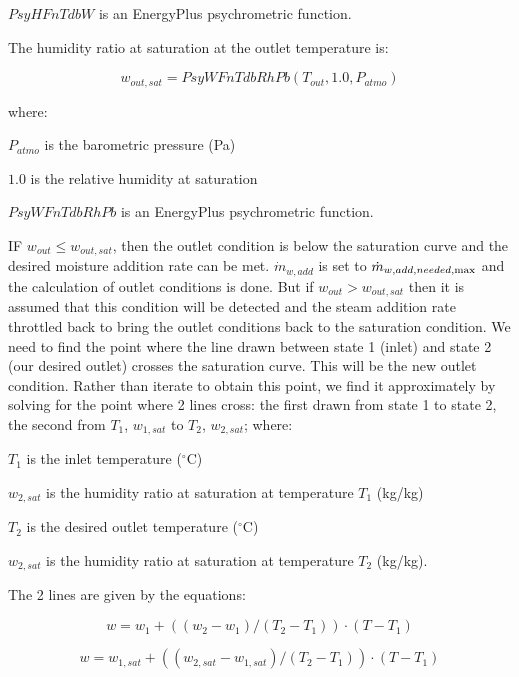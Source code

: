 \(PsyHFnTdbW\) is an EnergyPlus psychrometric function.

The humidity ratio at saturation at the outlet temperature is:

\begin{equation}
{w_{out,sat}} = PsyWFnTdbRhPb({T_{out}},1.0,{P_{atmo}})
\end{equation}

where:

\({P_{atmo}}\) is the barometric pressure (Pa)

\(1.0\) is the relative humidity at saturation

\(PsyWFnTdbRhPb\) is an EnergyPlus psychrometric function.

IF \({w_{out}} \le {w_{out,sat}}\), then the outlet condition is below the saturation curve and the desired moisture addition rate can be met. \({\dot m_{w,add}}\) is set to \({\dot m_{w,add,needed,{\rm{max}}}}\) and the calculation of outlet conditions is done. But if \({w_{out}} > {w_{out,sat}}\) then it is assumed that this condition will be detected and the steam addition rate throttled back to bring the outlet conditions back to the saturation condition. We need to find the point where the line drawn between state 1 (inlet) and state 2 (our desired outlet) crosses the saturation curve. This will be the new outlet condition. Rather than iterate to obtain this point, we find it approximately by solving for the point where 2 lines cross: the first drawn from state 1 to state 2, the second from \({T_1}\), \({w_{1,sat}}\) to \({T_2}\), \({w_{2,sat}}\); where:

\({T_1}\) is the inlet temperature (\(^{\circ}\)C)

\({w_{2,sat}}\) is the humidity ratio at saturation at temperature \({T_1}\) (kg/kg)

\({T_2}\) is the desired outlet temperature (\(^{\circ}\)C)

\({w_{2,sat}}\) is the humidity ratio at saturation at temperature \({T_2}\) (kg/kg).

The 2 lines are given by the equations:

\begin{equation}
w = {w_1} + (({w_2} - {w_1})/({T_2} - {T_1})) \cdot (T - {T_1})
\end{equation}

\begin{equation}
w = {w_{1,sat}} + (({w_{2,sat}} - {w_{1,sat}})/({T_2} - {T_1})) \cdot (T - {T_1})
\end{equation}

